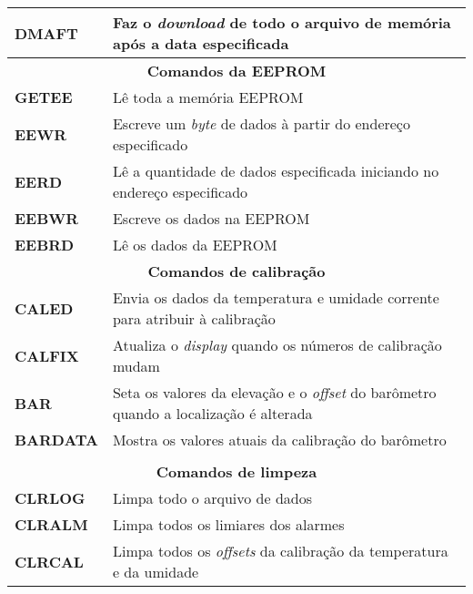 \begin{anexosenv}
\begin{center}
\begin{longtable}{ll}
        \textbf{DMAFT}                   & Faz o \textit{download} de todo o arquivo de memória após a data especificada \\ \hline
        \multicolumn{2}{c}{\cellcolor{gray!25}\textbf{Comandos da EEPROM}}                                     		 \\ \hline
        \textbf{GETEE}                 & Lê toda a memória EEPROM \\ \hline
        \textbf{EEWR}                   & Escreve um \textit{byte} de dados à partir do endereço especificado                                   \\ \hline
        \textbf{EERD}                   & Lê a quantidade de dados especificada iniciando no endereço especificado                                   \\ \hline
        \textbf{EEBWR}                   & Escreve os dados na EEPROM                                    \\ \hline
        \textbf{EEBRD}                   & Lê os dados da EEPROM \\ \hline
        \multicolumn{2}{c}{\cellcolor{gray!25}\textbf{Comandos de calibração}}                                     		 \\ \hline
        \textbf{CALED}                 & Envia os dados da temperatura e umidade corrente para atribuir à calibração \\ \hline
        \textbf{CALFIX}                   & Atualiza o \textit{display} quando os números de calibração mudam\\ \hline
        \textbf{BAR}                   & Seta os valores da elevação e o \textit{offset} do barômetro quando a localização é alterada                                   \\ \hline
        \textbf{BARDATA}                   & Mostra os valores atuais da calibração do barômetro                                   \\ \hline \\
        \multicolumn{2}{c}{\cellcolor{gray!25}\textbf{Comandos de limpeza}}                                     		 \\ \hline
        \textbf{CLRLOG}                 & Limpa todo o arquivo de dados                                                       \\ \hline
        \textbf{CLRALM}                   & Limpa todos os limiares dos alarmes                                   \\ \hline
        \textbf{CLRCAL}                   & Limpa todos os \textit{offsets} da calibração da temperatura e da umidade \\ \hline

\end{longtable}
\end{center}
\end{anexosenv}
